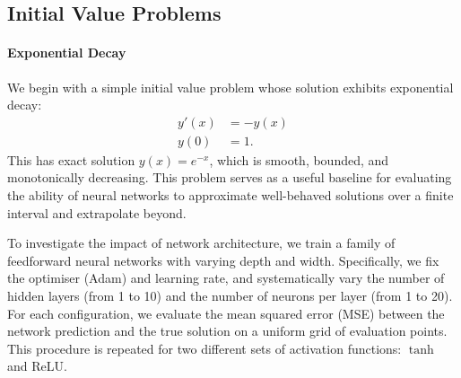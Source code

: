 \subsection{Initial Value Problems}\label{sec:IVPs}

\paragraph{Exponential Decay}

We begin with a simple initial value problem whose solution exhibits exponential decay:
\[
\begin{aligned}
    y'(x) &= -y(x) \\
    y(0) &= 1.
\end{aligned}
\]
This has exact solution \( y(x) = e^{-x} \), which is smooth, bounded, and monotonically decreasing. 
This problem serves as a useful baseline for evaluating the ability of neural networks to approximate 
well-behaved solutions over a finite interval and extrapolate beyond.

To investigate the impact of network architecture, we train a family of feedforward neural networks 
with varying depth and width. Specifically, we fix the optimiser (Adam) and learning rate, and 
systematically vary the number of hidden layers (from 1 to 10) and the number of neurons per layer 
(from 1 to 20). For each configuration, we evaluate the mean squared error (MSE) between the network 
prediction and the true solution on a uniform grid of evaluation points. This procedure is repeated 
for two different sets of activation functions: \( \tanh \) and ReLU.

